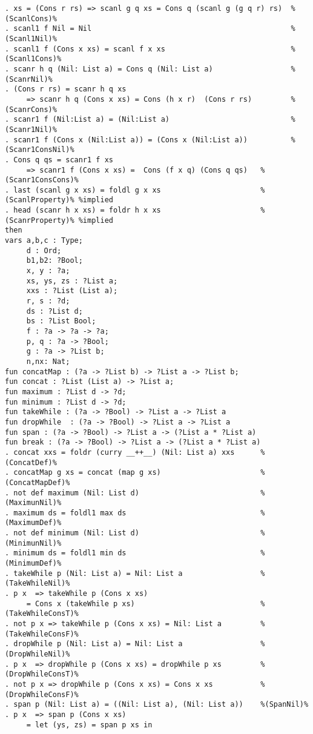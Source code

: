 \begin{Verbatim}
. xs = (Cons r rs) => scanl g q xs = Cons q (scanl g (g q r) rs)  %(ScanlCons)%
. scanl1 f Nil = Nil                                              %(Scanl1Nil)%
. scanl1 f (Cons x xs) = scanl f x xs                             %(Scanl1Cons)%
. scanr h q (Nil: List a) = Cons q (Nil: List a)                  %(ScanrNil)%
. (Cons r rs) = scanr h q xs
     => scanr h q (Cons x xs) = Cons (h x r)  (Cons r rs)         %(ScanrCons)%
. scanr1 f (Nil:List a) = (Nil:List a)                            %(Scanr1Nil)%
. scanr1 f (Cons x (Nil:List a)) = (Cons x (Nil:List a))          %(Scanr1ConsNil)%
. Cons q qs = scanr1 f xs  
     => scanr1 f (Cons x xs) =  Cons (f x q) (Cons q qs)   %(Scanr1ConsCons)%
. last (scanl g x xs) = foldl g x xs                       %(ScanlProperty)% %implied
. head (scanr h x xs) = foldr h x xs                       %(ScanrProperty)% %implied
then
vars a,b,c : Type;
     d : Ord;
     b1,b2: ?Bool;
     x, y : ?a;
     xs, ys, zs : ?List a;
     xxs : ?List (List a);
     r, s : ?d;
     ds : ?List d;
     bs : ?List Bool;
     f : ?a -> ?a -> ?a;
     p, q : ?a -> ?Bool;
     g : ?a -> ?List b;
     n,nx: Nat;
fun concatMap : (?a -> ?List b) -> ?List a -> ?List b;
fun concat : ?List (List a) -> ?List a;
fun maximum : ?List d -> ?d;
fun minimum : ?List d -> ?d;
fun takeWhile : (?a -> ?Bool) -> ?List a -> ?List a
fun dropWhile  : (?a -> ?Bool) -> ?List a -> ?List a
fun span : (?a -> ?Bool) -> ?List a -> (?List a * ?List a)
fun break : (?a -> ?Bool) -> ?List a -> (?List a * ?List a)
. concat xxs = foldr (curry __++__) (Nil: List a) xxs      %(ConcatDef)%
. concatMap g xs = concat (map g xs)                       %(ConcatMapDef)%
. not def maximum (Nil: List d)                            %(MaximunNil)%
. maximum ds = foldl1 max ds                               %(MaximumDef)%
. not def minimum (Nil: List d)                            %(MinimunNil)%
. minimum ds = foldl1 min ds                               %(MinimumDef)%
. takeWhile p (Nil: List a) = Nil: List a                  %(TakeWhileNil)%
. p x  => takeWhile p (Cons x xs) 
     = Cons x (takeWhile p xs)                             %(TakeWhileConsT)%
. not p x => takeWhile p (Cons x xs) = Nil: List a         %(TakeWhileConsF)%
. dropWhile p (Nil: List a) = Nil: List a                  %(DropWhileNil)%
. p x  => dropWhile p (Cons x xs) = dropWhile p xs         %(DropWhileConsT)%
. not p x => dropWhile p (Cons x xs) = Cons x xs           %(DropWhileConsF)%
. span p (Nil: List a) = ((Nil: List a), (Nil: List a))    %(SpanNil)%
. p x  => span p (Cons x xs) 
     = let (ys, zs) = span p xs in

\end{Verbatim}

